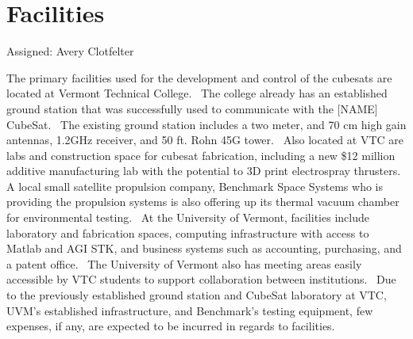 \section{Facilities}
Assigned: Avery Clotfelter

The primary facilities used for the development and control of the
cubesats are located at Vermont Technical College.  The college
already has an established ground station that was successfully used
to communicate with the [NAME] CubeSat.  The existing ground station
includes a two meter, and 70 cm high gain antennas, 1.2GHz receiver,
and 50 ft. Rohn 45G tower.  Also located at VTC are labs and
construction space for cubesat fabrication, including a new \$12
million additive manufacturing lab with the potential to 3D print
electrospray thrusters.  A local small satellite propulsion company,
Benchmark Space Systems who is providing the propulsion systems is
also offering up its thermal vacuum chamber for environmental
testing.  At the University of Vermont, facilities include laboratory
and fabrication spaces, computing infrastructure with access to Matlab
and AGI STK, and business systems such as accounting, purchasing, and
a patent office.  The University of Vermont also has meeting areas
easily accessible by VTC students to support collaboration between
institutions.  Due to the previously established ground station and
CubeSat laboratory at VTC, UVM’s established infrastructure, and
Benchmark’s testing equipment, few expenses, if any, are expected to
be incurred in regards to facilities.
